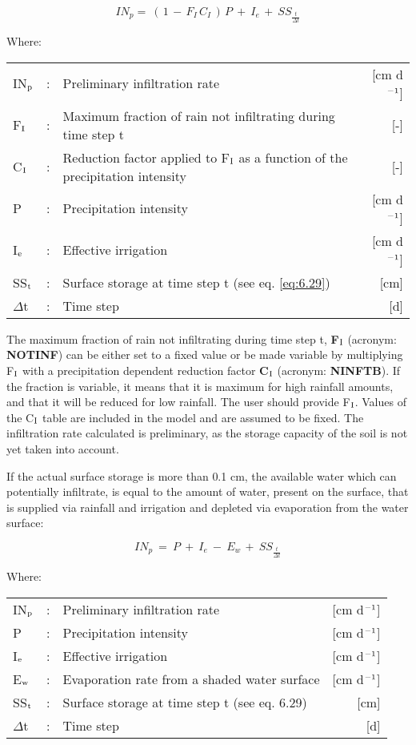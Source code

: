 \begin{equation}
\label{eq:6.26}
IN_{p} =~ (\, 1\, -\, F _{I} \, C _{I} \, )\, P~+~ I _{e~} +~ SS _{\frac{t}{ \Delta t}} 
\end{equation}

Where:\\[5pt]
\begin{tabularx}{\textwidth}{llXr}
	IN$_{{\rm p}}$ &:& Preliminary infiltration rate  & [cm d$^{{\rm -1}}$]\\
	F$_{{\rm I}}$ &:& Maximum fraction of rain not infiltrating during time step t  & [-]\\
	C$_{{\rm I}}$ &:& Reduction factor applied to F$_{{\rm I}}$ as a function of the 
	precipitation intensity  & [-]\\
	P &:& Precipitation intensity  & [cm d$^{{\rm -1}}$]\\
	I$_{{\rm e}}$ &:& Effective irrigation  & [cm d$^{{\rm -1}}$]\\
	SS$_{{\rm t}}$ &:& Surface storage at time step t (see eq. \ref{eq:6.29})  & [cm]\\
	$\Delta$t &:& Time step  & [d]\\
\end{tabularx}

The maximum fraction of rain not infiltrating during time step t, {\bf F$_{{\rm I}}$} 
(acronym: {\bf NOTINF})
can be either set to a fixed value or be made variable by multiplying F$_{{\rm I}}$ 
with a precipitation dependent reduction factor {\bf C$_{{\rm I}}$} (acronym: {\bf NINFTB}). 
If the fraction is variable, it means that it is maximum for high rainfall amounts, and 
that it will be reduced for low rainfall. The user should provide F$_{{\rm I}}$. 
Values of the C$_{{\rm I}}$ table are included in the model and
are assumed to be fixed. The infiltration rate calculated is preliminary, as the storage
capacity of the soil is not yet taken into account. 

If the actual surface storage is more than 0.1 cm, the available water which can 
potentially infiltrate, is equal to the amount of water, present on the surface, that is supplied via
rainfall and irrigation and depleted via evaporation from the water surface:

\begin{equation}
\label{eq:6.27}
IN_{p} ~=~P~+~I _{e} ~-~ E _{w~} +~ SS _{\frac{t}{\Delta t}} 
\end{equation}

Where:\\[5pt]
\begin{tabularx}{\textwidth}{llXr}
	IN$_{{\rm p}}$ &:& Preliminary infiltration rate  & [cm d$^{{\rm -1}}$]\\
	P &:& Precipitation intensity  & [cm d$^{{\rm -1}}$]\\
	I$_{{\rm e}}$ &:& Effective irrigation  & [cm d$^{{\rm -1}}$]\\
	E$_{{\rm w}}$ &:& Evaporation rate from a shaded water surface  & [cm d$^{{\rm -1}}$]\\
	SS$_{{\rm t}}$ &:& Surface storage at time step t (see eq. 6.29)  & [cm]\\
	$\Delta$t &:& Time step  & [d]\\
\end{tabularx}

